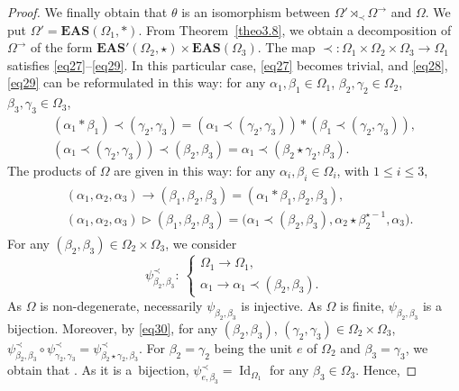 \documentclass[10pt,a4paper]{amsart}
\numberwithin{equation}{section}
\newcommand{\eas}{\mathbf{EAS}}
\begin{document}
\begin{proof}
We finally obtain that $\theta$ is an isomorphism between $\Omega'\rtimes_\prec \Omega^\rightarrow$ and $\Omega$. We put $\Omega'=\eas(\Omega_1,*)$.
From Theorem~\ref{theo3.8}, we obtain a decomposition of $\Omega^\rightarrow$ of the form $\eas'(\Omega_2,\star)\times \eas(\Omega_3)$.
The map $\prec\colon\Omega_1\times \Omega_2\times \Omega_3\longrightarrow \Omega_1$ satisfies \eqref{eq27}--\eqref{eq29}. In this particular case, \eqref{eq27} becomes trivial, and \eqref{eq28}, \eqref{eq29} can be reformulated in this way:
for any $\alpha_1,\beta_1\in \Omega_1$, $\beta_2,\gamma_2\in \Omega_2$, $\beta_3,\gamma_3\in \Omega_3$,
\begin{gather*}
(\alpha_1*\beta_1)\prec(\gamma_2,\gamma_3)=(\alpha_1\prec (\gamma_2,\gamma_3))*(\beta_1\prec (\gamma_2,\gamma_3)),\\
(\alpha_1\prec (\gamma_2,\gamma_3))\prec(\beta_2,\beta_3)=\alpha_1\prec (\beta_2\star \gamma_2,\beta_3).
\end{gather*}
The products of $\Omega$ are given in this way: for any $\alpha_i,\beta_i\in \Omega_i$, with $1\leqslant i\leqslant 3$,
\begin{gather*}
\begin{split}
& (\alpha_1,\alpha_2,\alpha_3)\rightarrow(\beta_1,\beta_2,\beta_3)=(\alpha_1*\beta_1,\beta_2,\beta_3),\\
& (\alpha_1,\alpha_2,\alpha_3)\triangleright(\beta_1,\beta_2,\beta_3)=\bigl(\alpha_1\prec (\beta_2,\beta_3),\alpha_2\star \beta_2^{\star-1},\alpha_3\bigr).
\end{split}
\end{gather*}
For any $(\beta_2,\beta_3)\in \Omega_2\times \Omega_3$, we consider
\[\psi^\prec_{\beta_2,\beta_3}\colon \ \begin{cases}
\Omega_1 \longrightarrow \Omega_1,\\
\alpha_1 \longrightarrow \alpha_1\prec (\beta_2,\beta_3).
\end{cases}\]
As $\Omega$ is non-degenerate, necessarily $\psi_{\beta_2,\beta_3}$ is injective. As $\Omega$ is finite, $\psi_{\beta_2,\beta_3}$ is a bijection.
Moreover, by \eqref{eq30}, for any $(\beta_2,\beta_3)$, $(\gamma_2,\gamma_3)\in \Omega_2\times \Omega_3$,
$\psi^\prec_{\beta_2,\beta_3}\circ \psi^\prec_{\gamma_2,\gamma_3}=\psi^\prec_{\beta_2\star \gamma_2,\beta_3}$.
For $\beta_2=\gamma_2$ being the unit $e$ of $\Omega_2$ and $\beta_3=\gamma_3$, we obtain that .
As it is a~bijection, $\psi^\prec_{e,\beta_3}=\operatorname{Id}_{\Omega_1}$ for any $\beta_3\in \Omega_3$. Hence,

\end{proof}
\end{document}
